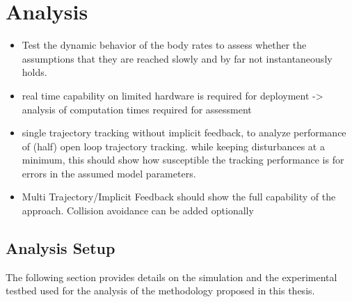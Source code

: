 \chapter{Analysis}\label{chap:analysis}


\begin{itemize}
	\color{red}
	\item Test the dynamic behavior of the body rates to assess whether the assumptions that they are reached slowly and by far not instantaneously holds.
	\item real time capability on limited hardware is required for deployment -> analysis of computation times required for assessment
	\item single trajectory tracking without implicit feedback, to analyze performance of (half) open loop trajectory tracking. while keeping disturbances at a minimum, this should show how susceptible the tracking performance is for errors in the assumed model parameters.
	\item Multi Trajectory/Implicit Feedback should show the full capability of the approach. Collision avoidance can be added optionally
\end{itemize}


\section{Analysis Setup}
The following section provides details on the simulation and the experimental testbed used for the analysis of the methodology proposed in this thesis.

